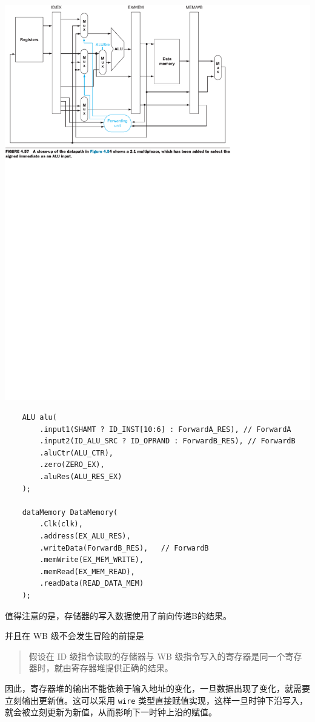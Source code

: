 \documentclass[a4paper,UTF8]{ctexart}
\providecommand{\code}[2]{}
\begin{document}
\includegraphics[width=\textwidth]{Imm.pdf}

\begin{lstlisting}
    ALU alu(
        .input1(SHAMT ? ID_INST[10:6] : ForwardA_RES), // ForwardA
        .input2(ID_ALU_SRC ? ID_OPRAND : ForwardB_RES), // ForwardB
        .aluCtr(ALU_CTR),
        .zero(ZERO_EX),
        .aluRes(ALU_RES_EX)
    );
    
    dataMemory DataMemory(
        .Clk(clk),
        .address(EX_ALU_RES),
        .writeData(ForwardB_RES),   // ForwardB
        .memWrite(EX_MEM_WRITE),
        .memRead(EX_MEM_READ),
        .readData(READ_DATA_MEM)
    );
\end{lstlisting}

值得注意的是，存储器的写入数据使用了前向传递B的结果。

并且在 WB 级不会发生冒险的前提是
\begin{quotation}
    假设在 ID 级指令读取的存储器与 WB 级指令写入的寄存器是同一个寄存器时，就由寄存器堆提供正确的结果。
\end{quotation}
因此，寄存器堆的输出不能依赖于输入地址的变化，一旦数据出现了变化，就需要立刻输出更新值。这可以采用 \verb"wire" 类型直接赋值实现，这样一旦时钟下沿写入，就会被立刻更新为新值，从而影响下一时钟上沿的赋值。
    \code{Registers.v}{verilog}
\end{document}
